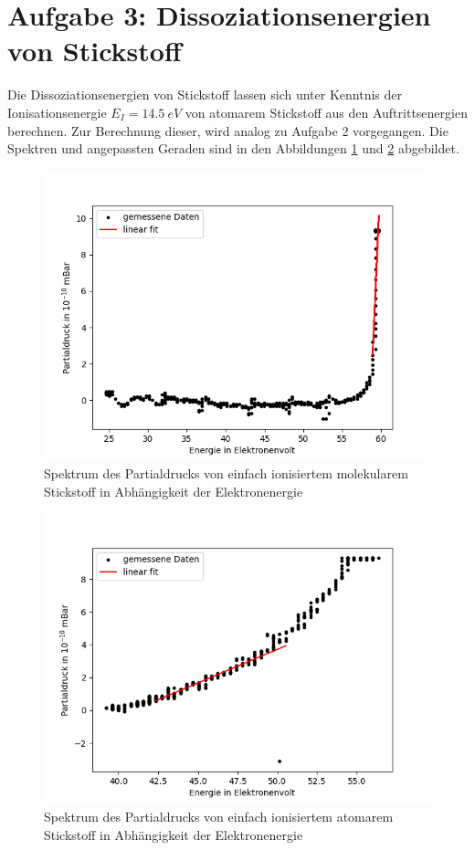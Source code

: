 \section{Aufgabe 3: Dissoziationsenergien von Stickstoff}

Die Dissoziationsenergien von Stickstoff lassen sich unter Kenntnis der Ionisationsenergie $E_I = \SI{14.5}{eV}$ von atomarem Stickstoff aus den Auftrittsenergien berechnen. Zur Berechnung dieser, wird analog zu Aufgabe 2 vorgegangen. Die Spektren und angepassten Geraden sind in den Abbildungen \ref{fig:MSN2Diss} und \ref{fig:MSNDiss} abgebildet.
\begin{figure}[H]
    \centering
    \includegraphics[width=120mm,scale=0.8]{Massenspektrometer/include/MSN2Diss.png}
    \caption{Spektrum des Partialdrucks von einfach ionisiertem molekularem Stickstoff in Abhängigkeit der Elektronenergie}
    \label{fig:MSN2Diss}
\end{figure}
\begin{figure}[H]
    \centering
    \includegraphics[width=120mm,scale=0.8]{Massenspektrometer/include/MSNDiss.png}
    \caption{Spektrum des Partialdrucks von einfach ionisiertem atomarem Stickstoff in Abhängigkeit der Elektronenergie}
    \label{fig:MSNDiss}
\end{figure}
